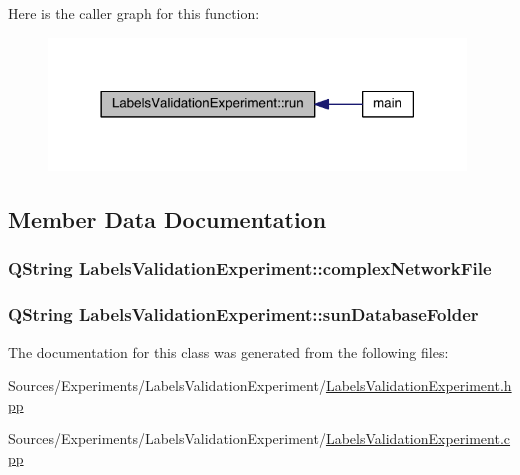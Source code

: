 Here is the caller graph for this function\+:\nopagebreak
\begin{figure}[H]
\begin{center}
\leavevmode
\includegraphics[width=314pt]{class_labels_validation_experiment_a139b4fc02f5bced4f013c0a025d66011_icgraph}
\end{center}
\end{figure}




\subsection{Member Data Documentation}
\hypertarget{class_labels_validation_experiment_a436f830f66b934412219500367a08b9f}{
\subsubsection[{complex\+Network\+File}]{\setlength{\rightskip}{0pt plus 5cm}Q\+String Labels\+Validation\+Experiment\+::complex\+Network\+File\hspace{0.3cm}{\ttfamily [private]}}}\label{class_labels_validation_experiment_a436f830f66b934412219500367a08b9f}
\hypertarget{class_labels_validation_experiment_a13c47376d09961370b63902e98d38fb1}{
\subsubsection[{sun\+Database\+Folder}]{\setlength{\rightskip}{0pt plus 5cm}Q\+String Labels\+Validation\+Experiment\+::sun\+Database\+Folder\hspace{0.3cm}{\ttfamily [private]}}}\label{class_labels_validation_experiment_a13c47376d09961370b63902e98d38fb1}


The documentation for this class was generated from the following files\+:\begin{DoxyCompactItemize}
\item 
Sources/\+Experiments/\+Labels\+Validation\+Experiment/\hyperlink{_labels_validation_experiment_8hpp}{Labels\+Validation\+Experiment.\+hpp}\item 
Sources/\+Experiments/\+Labels\+Validation\+Experiment/\hyperlink{_labels_validation_experiment_8cpp}{Labels\+Validation\+Experiment.\+cpp}\end{DoxyCompactItemize}
